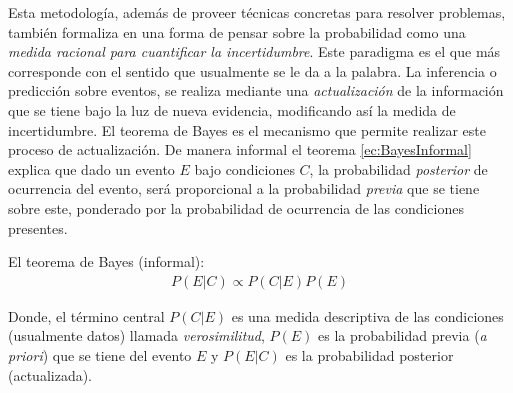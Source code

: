 \documentclass[../Main/Main.tex]{subfiles}
\begin{document}
Esta metodología, además de proveer técnicas concretas para resolver problemas, también formaliza en una forma de pensar sobre la probabilidad como una \textit{medida racional para cuantificar la incertidumbre}. Este paradigma es el que más corresponde con el sentido que usualmente se le da a la palabra. La inferencia o predicción sobre eventos, se realiza mediante una \textit{actualización} de la información que se tiene bajo la luz de nueva evidencia, modificando así la medida de incertidumbre. El teorema de Bayes es el mecanismo que permite realizar este proceso de actualización. De manera informal el teorema \eqref{ec:BayesInformal} explica que dado un evento $E$ bajo condiciones $C$, la probabilidad \textit{posterior} de ocurrencia del evento, será proporcional a la probabilidad \textit{previa} que se tiene sobre este, ponderado por la probabilidad de ocurrencia de las condiciones presentes. %

\begin{theorem} El teorema de Bayes (informal):
\begin{align}
P(E|C) \propto P(C|E)P(E) \label{ec:BayesInformal}
\end{align}
\end{theorem}
Donde, el término central $P(C|E)$ es una medida descriptiva de las condiciones (usualmente datos) llamada \textit{verosimilitud}, $P(E)$ es la probabilidad previa (\textit{a priori}) que se tiene del evento $E$ y $P(E|C)$ es la probabilidad posterior (actualizada).
\end{document}
